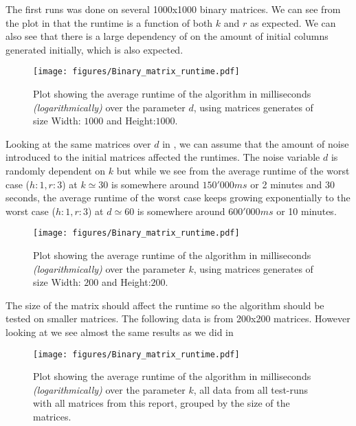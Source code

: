 \documentclass[a4paper]{article}
\begin{document}
The first runs was done on several 1000x1000 binary matrices. We can see from the plot in 
that the runtime is a function of both $k$ and $r$ as expected. We can also see that there is a large dependency of
on the amount of initial columns generated initially, which is also expected.

\begin{figure}[h]
    \centering
    \texttt{[image: figures/Binary\_matrix\_runtime.pdf]}
    \caption{Plot showing the average runtime of the algorithm in milliseconds \textit{(logarithmically)}
        over the parameter $d$, using matrices generates of size Width: $1000$ and Height:$1000$.}
    \label{fig:res-1000x1000d}
\end{figure}

Looking at the same matrices over $d$ in , we can assume that the amount of noise
introduced to the initial matrices affected the runtimes. The noise variable $d$ is randomly dependent on $k$
but while we see from  the average runtime of the worst case ($h:1,r:3$) at $k \simeq 30$
is somewhere around $150'000ms$ or 2 minutes and 30 seconds, the average runtime of the worst case keeps growing exponentially
to the worst case ($h:1,r:3$) at $d \simeq 60$ is somewhere around $600'000ms$ or 10 minutes.

\begin{figure}[h]
    \centering
    \texttt{[image: figures/Binary\_matrix\_runtime.pdf]}
    \caption{Plot showing the average runtime of the algorithm in milliseconds \textit{(logarithmically)}
        over the parameter $k$, using matrices generates of size Width: $200$ and Height:$200$.}
    \label{fig:res-200x200k}
\end{figure}

The size of the matrix should affect the runtime so the algorithm should be tested on smaller matrices. The
following data is from 200x200 matrices. However looking at  we see almost the same
results as we did in 

\begin{figure}[h]
    \centering
    \texttt{[image: figures/Binary\_matrix\_runtime.pdf]}
    \caption{Plot showing the average runtime of the algorithm in milliseconds \textit{(logarithmically)}
        over the parameter $k$, all data from all test-runs with all matrices from this report, grouped by
        the size of the matrices.}
    \label{fig:res-all-matrices-over-k}
\end{figure}
\end{document}
